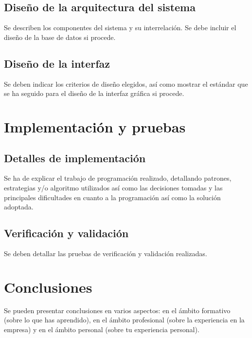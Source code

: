 \documentclass[pdftex,11pt,a4paper]{book}
\begin{document}


\section{Diseño de la arquitectura del sistema}

Se describen los componentes del sistema y su interrelación. Se debe incluir el diseño de la base de datos si procede.

\section{Diseño de la interfaz}

Se deben indicar los criterios de diseño elegidos, así como mostrar el estándar que se ha seguido para el diseño de la interfaz gráfica si procede.



\chapter{Implementación y pruebas}

\section{Detalles de implementación}

Se ha de explicar el trabajo de programación realizado, detallando patrones, estrategias y/o algoritmo utilizados así como las decisiones tomadas y las principales dificultades en cuanto a la programación así como la solución adoptada. 

\section{Verificación y validación}

Se deben detallar las pruebas de verificación y validación realizadas.



\chapter{Conclusiones}
Se pueden presentar conclusiones en varios aspectos: en el ámbito formativo (sobre lo que has aprendido), en el ámbito profesional (sobre la experiencia en la empresa) y en el ámbito personal (sobre tu experiencia personal).
\end{document}
